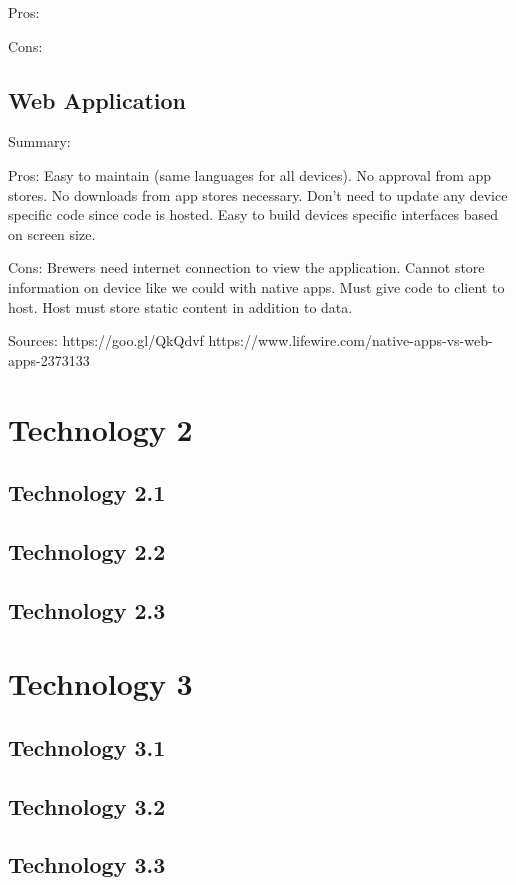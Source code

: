 \documentclass[draftclsnofoot,onecolumn,letterpaper,10pt,compsoc]{IEEEtran}
\begin{document}
    Pros:
    
    Cons:
    
	\subsection{Web Application}
    Summary:
    
    Pros:
    Easy to maintain (same languages for all devices).
    No approval from app stores.
    No downloads from app stores necessary.
    Don't need to update any device specific code since code is hosted.
    Easy to build devices specific interfaces based on screen size.
    
    Cons:
    Brewers need internet connection to view the application.
    Cannot store information on device like we could with native apps.
    Must give code to client to host.
    Host must store static content in addition to data.
    
    Sources:
    https://goo.gl/QkQdvf
    https://www.lifewire.com/native-apps-vs-web-apps-2373133

\section{Technology 2}
	\subsection{Technology 2.1}
	\subsection{Technology 2.2}
	\subsection{Technology 2.3}

\section{Technology 3}
	\subsection{Technology 3.1}
	\subsection{Technology 3.2}
	\subsection{Technology 3.3}
\end{document}

